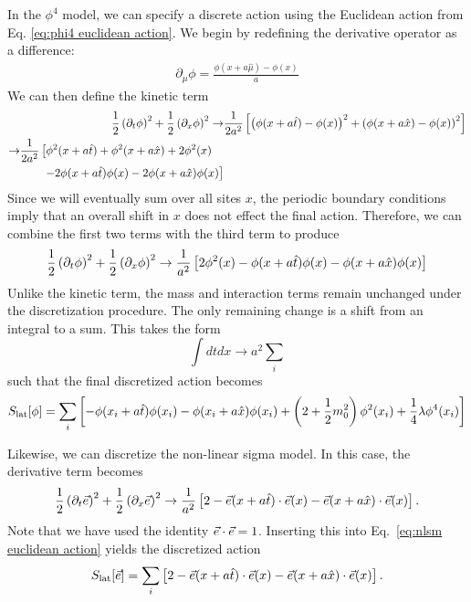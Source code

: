 In the $\phi^4$ model, we can specify a discrete action using the Euclidean action from Eq. \ref{eq:phi4 euclidean action}. We begin by redefining the derivative operator as a difference:
\begin{align}
    \partial_\mu \phi = \frac{\phi\left(x + a \hat{\mu}\right) - \phi(x)}{a}
\end{align}
We can then define the kinetic term
\begin{align}
    \half \left(\partial_t\phi\right)^2 + \half \left(\partial_x\phi\right)^2 \rightarrow& \frac{1}{2a^2}\left[ \left(\phi(x+a \hat{t}) -\phi(x)\right)^2 + \left(\phi(x+a \hat{x}) -\phi(x)\right)^2\right] \\
    \begin{split} \rightarrow& \frac{1}{2a^2}\left[ \phi^2(x+a\hat{t}) + \phi^2(x+a\hat{x}) + 2\phi^2(x)\right.\\ &\qquad \left.- 2\phi(x+a\hat{t})\phi(x) - 2\phi(x+a\hat{x})\phi(x) \right]\hfilneg\end{split}
\end{align}
Since we will eventually sum over all sites $x$, the periodic boundary conditions imply that an overall shift in $x$ does not effect the final action. Therefore, we can combine the first two terms with the third term to produce 
\begin{equation}
    \frac{1}{2} \left(\partial_t\phi\right)^2 + \frac{1}{2} \left(\partial_x\phi\right)^2 \rightarrow \frac{1}{a^2}\left[ 2\phi^2(x) - \phi(x+a\hat{t})\phi(x) - \phi(x+a\hat{x})\phi(x) \right]
\end{equation}
Unlike the kinetic term, the mass and interaction terms remain unchanged under the discretization procedure. The only remaining change is a shift from an integral to a sum. This takes the form
\begin{equation}
    \label{eq:disc def}
    \int dtdx \rightarrow a^2 \sum_i
\end{equation}
such that the final discretized action becomes
\begin{equation}
    \label{eq:phi4 discretized action}
    S_{\mathrm{lat}}[\phi] = \sum_i \left[-\phi(x_i + a\hat{t})\phi(x_i) - \phi(x_i + a\hat{x})\phi(x_i) + \left(2+\frac{1}{2} m_0^2\right)\phi^2(x_i) + \frac{1}{4}\lambda \phi^4(x_i)\right]
\end{equation}

Likewise, we can discretize the non-linear sigma model. In this case, the derivative term becomes 
\begin{equation}
    \frac{1}{2} \left(\partial_t\vec e\right)^2 + \frac{1}{2} \left(\partial_x\vec e\right)^2 \rightarrow \frac{1}{a^2}\left[ 2 - \vec e(x+a\hat{t})\cdot\vec e(x) - \vec e(x+a\hat{x})\cdot\vec e(x) \right].
\end{equation}
Note that we have used the identity $\vec e\cdot\vec e = 1$. Inserting this into Eq.~\ref{eq:nlsm euclidean action} yields the discretized action
\begin{equation}
    \label{eq:nlsm discretized action}
    S_\mathrm{lat}[\vec e] = \sum_i \left[ 2 - \vec e(x+a\hat{t})\cdot\vec e(x) - \vec e(x+a\hat{x})\cdot\vec e(x) \right].
\end{equation}

